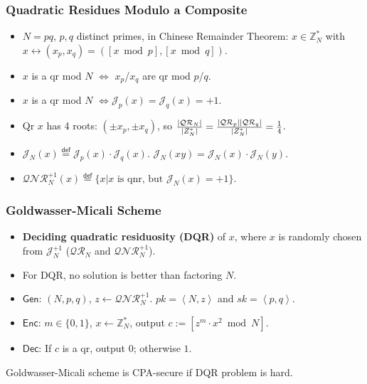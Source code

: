 \begin{frame}\frametitle{Quadratic Residues Modulo a Composite}
\begin{itemize}
\item $N = pq$, $p,q$ distinct primes, in Chinese Remainder Theorem: 
$x \in \mathbb{Z}_N^*$ with $ x \leftrightarrow (x_p,x_q) = ([x \bmod p], [x \bmod q])$.
\item $x$ is a qr mod $N$ $\iff$ $x_p$/$x_q$ are qr mod $p$/$q$.
\item $x$ is a qr mod $N$ $\iff \mathcal{J}_p(x) = \mathcal{J}_q(x) = +1$.
\item Qr $x$ has 4 roots: $(\pm x_p, \pm x_q)$, so $\frac{\lvert\mathcal{QR}_N\rvert}{\lvert Z_N^*\rvert} = \frac{\lvert\mathcal{QR}_p\rvert\lvert\mathcal{QR}_q\rvert}{\lvert Z_N^*\rvert}=\frac{1}{4}$.
\item $\mathcal{J}_N(x) \overset{\mathsf{def}}{=} \mathcal{J}_p(x) \cdot \mathcal{J}_q(x)$. $\mathcal{J}_N(xy) = \mathcal{J}_N(x)\cdot \mathcal{J}_N(y)$.
\item $\mathcal{QNR}_N^{+1}(x) \overset{\mathsf{def}}{=} \{ x | x \text{ is qnr, but } \mathcal{J}_N(x) = +1\}$.
\end{itemize}
\begin{figure}
\begin{center}

\end{center}
\end{figure}
\end{frame}
\begin{frame}\frametitle{Goldwasser-Micali Scheme}
\begin{itemize}
\item \textbf{Deciding quadratic residuosity (DQR)} of $x$, where $x$ is randomly chosen from $\mathcal{J}_N^{+1}$ ($\mathcal{QR}_N$ and $\mathcal{QNR}_N^{+1}$).
\item For DQR, no solution is better than factoring $N$.
\end{itemize}
\begin{construction}
\begin{itemize}
\item $\mathsf{Gen}$: $(N,p,q)$, $z \gets \mathcal{QNR}_N^{+1}$. $pk = \left<N,z\right>$ and $sk=\left<p,q\right>$.
\item $\mathsf{Enc}$: $m\in \{0,1\}$, $x\gets \mathbb{Z}_N^*$, output $c := [z^m\cdot x^2 \bmod N]$.
\item $\mathsf{Dec}$: If $c$ is a qr, output $0$; otherwise $1$.
\end{itemize}
\end{construction}
Goldwasser-Micali scheme is CPA-secure if DQR problem is hard.
\end{frame}
